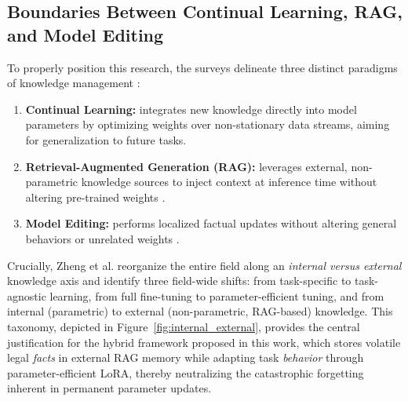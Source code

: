\subsection{Boundaries Between Continual Learning, RAG, and Model Editing}
To properly position this research, the surveys delineate three distinct paradigms of knowledge management \parencite{wu2024continuallearninglargelanguage, zheng2024lifelonglearninglargelanguage}:
\begin{enumerate}
    \item \textbf{Continual Learning:} integrates new knowledge directly into model parameters by optimizing weights over non-stationary data streams, aiming for generalization to future tasks.
    \item \textbf{Retrieval-Augmented Generation (RAG):} leverages external, non-parametric knowledge sources to inject context at inference time without altering pre-trained weights \parencite{11328884}.
    \item \textbf{Model Editing:} performs localized factual updates without altering general behaviors or unrelated weights \parencite{guo2025continuallearninggenerativeai}.
\end{enumerate}
Crucially, Zheng et al. \parencite{zheng2024lifelonglearninglargelanguage} reorganize the entire field along an \emph{internal versus external} knowledge axis and identify three field-wide shifts: from task-specific to task-agnostic learning, from full fine-tuning to parameter-efficient tuning, and from internal (parametric) to external (non-parametric, RAG-based) knowledge. This taxonomy, depicted in Figure~\ref{fig:internal_external}, provides the central justification for the hybrid framework proposed in this work, which stores volatile legal \emph{facts} in external RAG memory while adapting task \emph{behavior} through parameter-efficient LoRA, thereby neutralizing the catastrophic forgetting inherent in permanent parameter updates.


